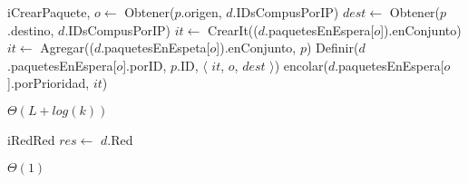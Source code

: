 \begin{Algoritmos}
  \begin{algoritmo}{iCrearPaquete}{,}{}
     $o \gets$ Obtener($p$.origen, $d$.IDsCompusPorIP)
     $dest \gets$ Obtener($p$.destino, $d$.IDsCompusPorIP)
    $it \gets$ CrearIt(($d$.paquetesEnEspera[$o$]).enConjunto)
    $it \gets$ Agregar(($d$.paquetesEnEspeta[$o$]).enConjunto, $p$)
    Definir($d$.paquetesEnEspera[$o$].porID, $p$.ID, $\langle$ $it$, $o$, $dest$ $\rangle$)
    encolar($d$.paquetesEnEspera[$o$].porPrioridad, $it$)
  \end{algoritmo}
  \datosAlgoritmo{} %
  {} %
  {} %
  {$\Theta(L+log(k))$} %
  {} %

  \begin{algoritmo}{iRed}{}{Red}
    $res \gets$ $d$.Red 
  \end{algoritmo}
  \datosAlgoritmo{} %
  {} %
  {} %
  {$\Theta(1)$} %
  {} %


\end{Algoritmos}
